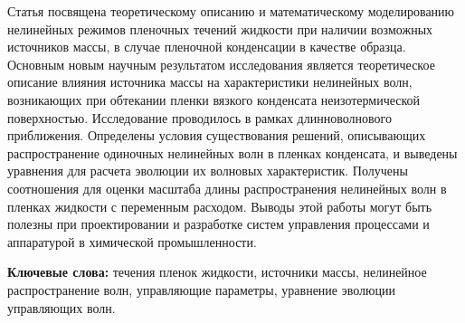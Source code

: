 Статья посвящена теоретическому описанию и математическому моделированию
нелинейных режимов пленочных течений жидкости при наличии возможных
источников массы, в случае пленочной конденсации в качестве образца.
Основным новым научным результатом исследования является теоретическое
описание влияния источника массы на характеристики нелинейных волн,
возникающих при обтекании пленки вязкого конденсата неизотермической
поверхностью. Исследование проводилось в рамках длинноволнового
приближения. Определены условия существования решений, описывающих
распространение одиночных нелинейных волн в пленках конденсата, и
выведены уравнения для расчета эволюции их волновых характеристик.
Получены соотношения для оценки масштаба длины распространения
нелинейных волн в пленках жидкости с переменным расходом. Выводы этой
работы могут быть полезны при проектировании и разработке систем
управления процессами и аппаратурой в химической промышленности.

{\bfseries Ключевые слова:} течения пленок жидкости, источники массы,
нелинейное распространение волн, управляющие параметры, уравнение
эволюции управляющих волн.

